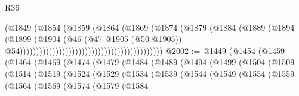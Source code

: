 \begin{lexlean}{R36}
\begin{coremodule}
                                                                  (@1849
                                                                    (@1854
                                                                      (@1859
                                                                        (@1864
                                                                          (@1869
                                                                            (@1874
                                                                              (@1879
                                                                                (@1884
                                                                                  (@1889
                                                                                    (@1894
                                                                                      (@1899
                                                                                        (@1904
                                                                                          (@46
                                                                                            (@47
                                                                                              @1905
                                                                                              (@50
                                                                                                @1905))
                                                                                            @54))))))))))))))))))))))))))))))))))))))))))))
@2002 := @1449
    (@1454
      (@1459
        (@1464
          (@1469
            (@1474
              (@1479
                (@1484
                  (@1489
                    (@1494
                      (@1499
                        (@1504
                          (@1509
                            (@1514
                              (@1519
                                (@1524
                                  (@1529
                                    (@1534
                                      (@1539
                                        (@1544
                                          (@1549
                                            (@1554
                                              (@1559
                                                (@1564
                                                  (@1569
                                                    (@1574
                                                      (@1579
                                                        (@1584

\end{coremodule}
\end{lexlean}
